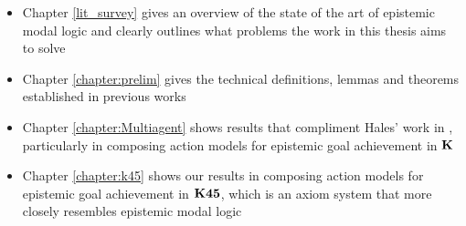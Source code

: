 \begin{itemize}
	\item Chapter \ref{lit_survey} gives an overview of the state of the art of epistemic modal logic
		and clearly outlines what problems the work in this thesis aims to solve
	\item Chapter \ref{chapter:prelim} gives the technical definitions, lemmas and theorems
		established in previous works
	\item Chapter \ref{chapter:Multiagent} shows results that compliment Hales' work in
		\cite{hales13synthesis}, particularly in composing action models for epistemic goal
		achievement in $\bf K$
	\item Chapter \ref{chapter:k45} shows our results in composing action models for epistemic goal
		achievement in $\bf K45$, which is an axiom system that more closely resembles epistemic modal
		logic
\end{itemize}
